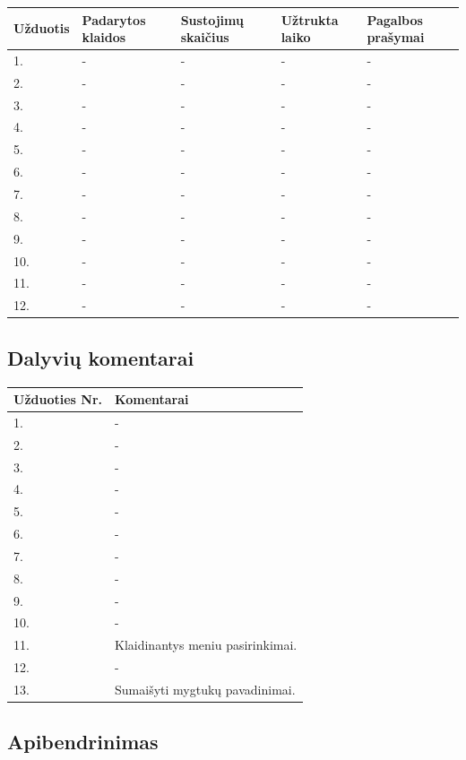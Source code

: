 \documentclass[oneside]{VUMIFPSkursinis}
\begin{document}
\begin{center}
\begin{table}[!pht]
\begin{tabular}{ |p{1.8cm} | p{3.4cm} | p{3.4cm} | p{2.5cm} | p{3.5cm}|}
	\hline
	Užduotis&Padarytos klaidos&Sustojimų skaičius&Užtrukta laiko&Pagalbos prašymai\\ \hline
1.&-&-&-&- \\ \hline
2.&-&-&-&- \\ \hline
3.&-&-&-&- \\ \hline
4.&-&-&-&- \\ \hline
5.&-&-&-&- \\ \hline
6.&-&-&-&- \\ \hline
7.&-&-&-&- \\ \hline
8.&-&-&-&- \\ \hline
9.&-&-&-&- \\ \hline
10.&-&-&-&- \\ \hline
11.&-&-&-&- \\ \hline
12.&-&-&-&- \\ \hline
\end{tabular}
\end{table}
\vspace{0.7cm}
\end{center}
\subsection{Dalyvių komentarai}
\begin{center}
	\begin{tabular}{ |p{3cm}| p{12cm} |}
	\hline
Užduoties Nr.&Komentarai\\ \hline
1. & - \\ \hline
2. & - \\ \hline
3. & - \\ \hline
4. & - \\ \hline
5. & - \\ \hline
6. & - \\ \hline
7. & - \\ \hline
8. & - \\ \hline
9. & - \\ \hline
10. & - \\ \hline
11. & Klaidinantys meniu pasirinkimai. \\ \hline
12. & - \\ \hline
13. & Sumaišyti mygtukų pavadinimai.\\ \hline
	\end{tabular}
\end{center}
\subsection{Apibendrinimas}
\end{document}
